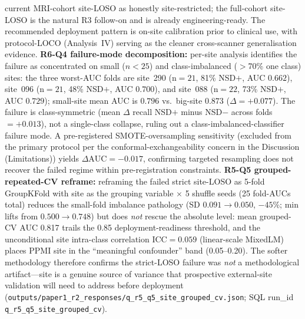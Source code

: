 \documentclass[10pt,letterpaper]{article}
\begin{document}
current MRI-cohort site-LOSO as honestly site-restricted; the full-cohort site-LOSO is the natural R3 follow-on and is already engineering-ready. The recommended deployment pattern is on-site calibration prior to clinical use, with protocol-LOCO (Analysis~IV) serving as the cleaner cross-scanner generalisation evidence. \textbf{R6-Q4 failure-mode decomposition:} per-site analysis identifies the failure as concentrated on small ($n{<}25$) and class-imbalanced ($>$70\% one class) sites: the three worst-AUC folds are site~290 (n${=}21$, 81\% NSD$+$, AUC $0.662$), site~096 (n${=}21$, 48\% NSD$+$, AUC $0.700$), and site~088 (n${=}22$, 73\% NSD$+$, AUC $0.729$); small-site mean AUC is $0.796$ vs.\ big-site $0.873$ ($\Delta = +0.077$). The failure is class-symmetric (mean $\Delta$ recall NSD$+$ minus NSD$-$ across folds $= +0.013$), not a single-class collapse, ruling out a class-imbalanced-classifier failure mode. A pre-registered SMOTE-oversampling sensitivity (excluded from the primary protocol per the conformal-exchangeability concern in the Discussion (Limitations)) yields $\Delta\mathrm{AUC} = -0.017$, confirming targeted resampling does not recover the failed regime within pre-registration constraints. \textbf{R5-Q5 grouped-repeated-CV reframe:} reframing the failed strict site-LOSO as 5-fold GroupKFold with site as the grouping variable $\times$ 5 shuffle seeds (25 fold-AUCs total) reduces the small-fold imbalance pathology (SD $0.091 \rightarrow 0.050$, $-45\%$; min lifts from $0.500 \rightarrow 0.748$) but does \emph{not} rescue the absolute level: mean grouped-CV AUC 0.817 trails the 0.85 deployment-readiness threshold, and the unconditional site intra-class correlation $\mathrm{ICC}{=}0.059$ (linear-scale MixedLM) places PPMI site in the ``meaningful confounder'' band (0.05--0.20). The softer methodology therefore confirms the strict-LOSO failure was \emph{not} a methodological artifact---site is a genuine source of variance that prospective external-site validation will need to address before deployment (\texttt{outputs/paper1\_r2\_responses/q\_r5\_q5\_site\_grouped\_cv.json}; SQL run\_id \texttt{q\_r5\_q5\_site\_grouped\_cv}).
\end{document}
